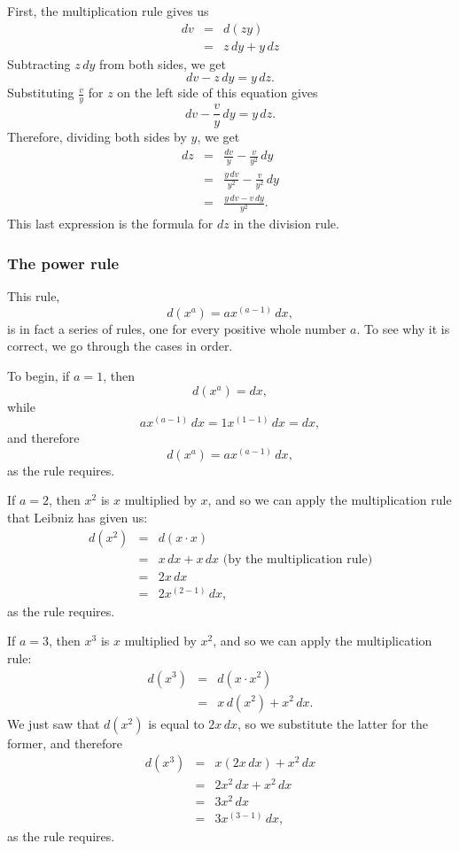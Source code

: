 \documentclass[twoside,openright]{article}
\newlength{\oldjot}
\begin{document}
First, the multiplication rule gives us
\setlength{\jot}{1.5ex}
\begin{eqnarray*}
dv & = & d(zy)\\
& = & z\,dy  + y\,dz
\end{eqnarray*}
Subtracting $z\,dy$ from both sides, we get
$$dv - z\,dy = y\,dz.$$
Substituting $\frac{v}{y}$ for $z$ on the left side of this equation gives
$$ dv - \frac{v}{y}\, dy = y\,dz.$$
Therefore, dividing both sides by $y$, we get
\setlength{\jot}{1.5ex}
\begin{eqnarray*}
dz & = & \frac{dv}{y} - \frac{v}{y^2}\,dy\\
& = & \frac{y\,dv}{y^2} - \frac{v}{y^2}\,dy\\
& = & \frac{y\,dv - v\,dy}{y^2}.
\end{eqnarray*}
\setlength{\jot}{\oldjot}
This last expression is the formula for $dz$ in the division rule.

\subsubsection*{The power rule}

This rule,
$$d(x^a) = ax^{(a-1)}\,dx,$$
is in fact a series of rules, one for every positive whole number $a$.
To see why it is correct, we go through the cases in order.

To begin, if $a=1$, then
$$d(x^a) = dx,$$
while 
$$ax^{(a-1)}\,dx = 1x^{(1-1)}\,dx = dx,$$
and therefore
$$d(x^a) = ax^{(a-1)}\,dx,$$
as the rule requires.


If $a=2$, then $x^2$ is $x$ multiplied by $x$, and so we can apply the
multiplication rule that Leibniz has given us:
\begin{eqnarray*}
d(x^2)&  = & d(x\cdot x) \\
 & = & x\,dx + x\,dx \mbox{ (by the multiplication rule)}\\
  & = & 2x\,dx \\
  & = & 2x^{(2-1)}\,dx,
 \end{eqnarray*}
as the rule requires.

If $a=3$, then $x^3$ is $x$ multiplied by $x^2$, and so we can apply
the multiplication rule:
\begin{eqnarray*}
d(x^3) & = & d(x\cdot x^2) \\
 & = & x\,d(x^2) + x^2\,dx.
 \end{eqnarray*}
 We just saw that $d(x^2)$ is equal to $2x\,dx$, so we substitute the
 latter for the former, and therefore
\begin{eqnarray*}
d(x^3) & = & x(2x\,dx) + x^2\,dx \\
 & = & 2x^2\,dx + x^2\,dx \\
  & = & 3x^2\,dx \\
   & = & 3x^{(3-1)}\,dx,
 \end{eqnarray*}
as the rule requires.
\end{document}

